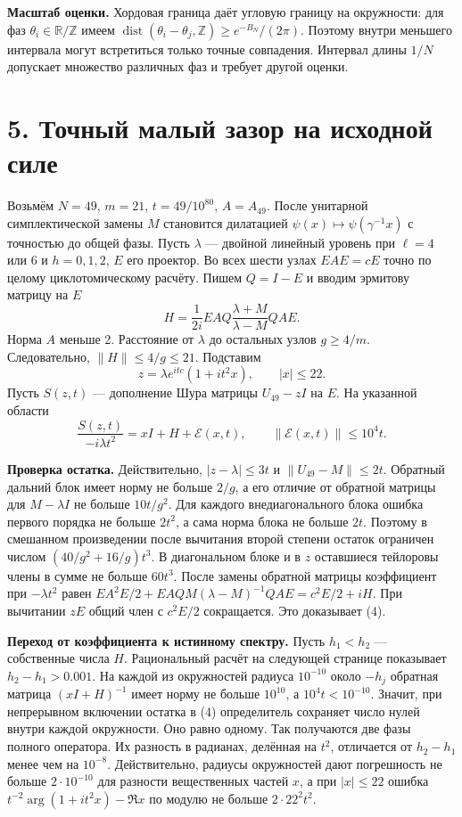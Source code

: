 \documentclass[11pt,a4paper]{article}
\newcommand{\R}{\mathbb R}
\newcommand{\Z}{\mathbb Z}
\newcommand{\sect}[1]{\section*{\sffamily\color{ink}#1}}
\newcommand{\subt}[1]{\par\medskip\noindent\textbf{#1.}\quad}
\begin{document}
\subt{Масштаб оценки}
Хордовая граница даёт угловую границу на окружности: для фаз \(\theta_i\in\R/\Z\) имеем \(\operatorname{dist}(\theta_i-\theta_j,\Z)\ge e^{-B_N}/(2\pi)\). Поэтому внутри меньшего интервала могут встретиться только точные совпадения. Интервал длины \(1/N\) допускает множество различных фаз и требует другой оценки.

\newpage
\sect{5. Точный малый зазор на исходной силе}
Возьмём \(N=49\), \(m=21\), \(t=49/10^{80}\), \(A=A_{49}\). После унитарной симплектической замены \(M\) становится дилатацией \(\psi(x)\mapsto\psi(\gamma^{-1}x)\) с точностью до общей фазы. Пусть \(\lambda\) --- двойной линейный уровень при \(\ell=4\) или \(6\) и \(h=0,1,2\), \(E\) его проектор. Во всех шести узлах \(EAE=cE\) точно по целому циклотомическому расчёту. Пишем \(Q=I-E\) и вводим эрмитову матрицу на \(E\)
\[
    H=\frac{1}{2i}EAQ\frac{\lambda+M}{\lambda-M}QAE .
\]
Норма \(A\) меньше 2. Расстояние от \(\lambda\) до остальных узлов \(g\ge4/m\). Следовательно, \(\|H\|\le4/g\le21\). Подставим
\[
      z=\lambda e^{itc}(1+it^2x),\qquad |x|\le22 .
\]
Пусть \(S(z,t)\) --- дополнение Шура матрицы \(U_{49}-zI\) на \(E\). На указанной области
\[
        \frac{S(z,t)}{-i\lambda t^2}
                 =xI+H+\mathcal E(x,t),\qquad
                     \|\mathcal E(x,t)\|\le10^4t.             \tag{4}
\]

\subt{Проверка остатка}
Действительно, \(|z-\lambda|\le3t\) и \(\|U_{49}-M\|\le2t\). Обратный дальний блок имеет норму не больше \(2/g\), а его отличие от обратной матрицы для \(M-\lambda I\) не больше \(10t/g^2\). Для каждого внедиагонального блока ошибка первого порядка не больше \(2t^2\), а сама норма блока не больше \(2t\). Поэтому в смешанном произведении после вычитания второй степени остаток ограничен числом \((40/g^2+16/g)t^3\). В диагональном блоке и в \(z\) оставшиеся тейлоровы члены в сумме не больше \(60t^3\). После замены обратной матрицы коэффициент при \(-\lambda t^2\) равен \(EA^2E/2+EAQM(\lambda-M)^{-1}QAE=c^2 E/2+iH\). При вычитании \(zE\) общий член с \(c^2E/2\) сокращается. Это доказывает (4).

\subt{Переход от коэффициента к истинному спектру}
Пусть \(h_1<h_2\) --- собственные числа \(H\). Рациональный расчёт на следующей странице показывает \(h_2-h_1>0.001\). На каждой из окружностей радиуса \(10^{-10}\) около \(-h_j\) обратная матрица \((xI+H)^{-1}\) имеет норму не больше \(10^{10}\), а \(10^4t<10^{-10}\). Значит, при непрерывном включении остатка в (4) определитель сохраняет число нулей внутри каждой окружности. Оно равно одному. Так получаются две фазы полного оператора. Их разность в радианах, делённая на \(t^2\), отличается от \(h_2-h_1\) менее чем на \(10^{-8}\). Действительно, радиусы окружностей дают погрешность не больше \(2\cdot10^{-10}\) для разности вещественных частей \(x\), а при \(|x|\le22\) ошибка \(t^{-2}\arg(1+it^2x)-\Re x\) по модулю не больше \(2\cdot22^2t^2\).
\end{document}
